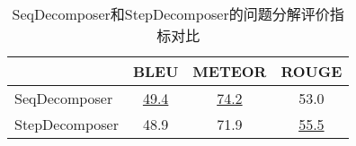 \begin{table}[htbp]
    \centering
    \caption{SeqDecomposer和StepDecomposer的问题分解评价指标对比}
    \begin{tabular}{lccc}
    \hline
    & BLEU & METEOR & ROUGE \\
    \hline
    SeqDecomposer & \underline{49.4} & \underline{74.2} & 53.0 \\
    StepDecomposer & 48.9 & 71.9 & \underline{55.5} \\
    \hline
    \end{tabular}
    \label{tab:5-4}
\end{table}

